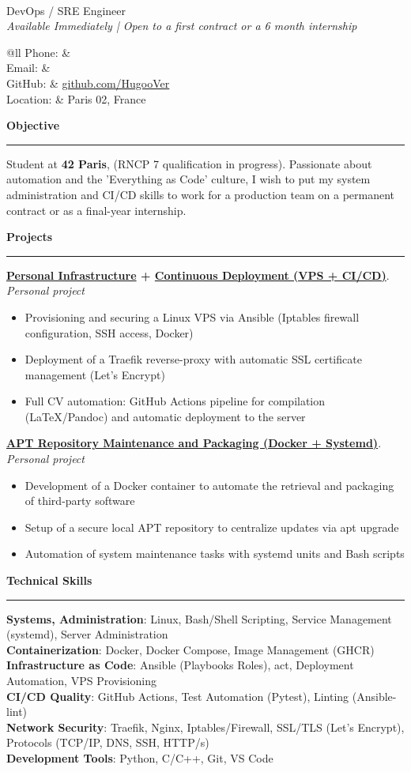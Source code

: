 \documentclass[10pt,a4paper]{article}
\makeatletter
\newcommand{\nom}{\detokenize{${NAME}}}
\newcommand{\poste}{DevOps / SRE Engineer}
\newcommand{\mail}{\detokenize{${MAIL}}}
\newcommand{\phone}{\detokenize{${PHONE}}}
\newcommand{\makecvheader}{
      \begin{minipage}[t]{0.6\textwidth}
        {\huge \textbf{\nom}}\\[0.2em]
        {\large \poste}\\[0.5em]
        \textit{Available Immediately | Open to a first contract or a 6 month internship}
      \end{minipage}
      \hfill
      \begin{minipage}[t]{0.35\textwidth}
        \begin{tabular}{@{}ll}
          Phone: & \phone \\
          Email: & \href{mailto:\mail}{\mail{}} \\
          GitHub: & \href{https://github.com/HugooVer}{github.com/HugooVer} \\
          Location: & Paris 02, France \\
        \end{tabular}
      \end{minipage}
      \vspace{0.4em}
    }
\newcommand{\cvsection}[1]{
      \vspace{0.8em}
      {\large\bfseries\textcolor{sectioncolor}{#1}}\\[-0.5em]
      \rule{\linewidth}{0.4pt}\vspace{0.4em}
    }
\makeatother
\begin{document}
\makecvheader


\cvsection{Objective}
Student at \textbf{42 Paris}, (RNCP 7 qualification in progress). Passionate about automation and the 'Everything as Code' culture, I wish to put my system administration and CI/CD skills to work for a production team on a permanent contract or as a final-year internship.

\cvsection{Projects}
\textbf{\href{https://github.com/HugooVer/my-vps}{Personal Infrastructure} + \href{https://github.com/HugooVer/Resume-CI-CD}{Continuous Deployment (VPS + CI/CD)}}.\\
\textit{Personal project}
\begin{itemize}
  \item Provisioning and securing a Linux VPS via Ansible (Iptables firewall configuration, SSH access, Docker)
  \item Deployment of a Traefik reverse-proxy with automatic SSL certificate management (Let's Encrypt)
  \item Full CV automation: GitHub Actions pipeline for compilation (LaTeX/Pandoc) and automatic deployment to the server
\end{itemize}

\textbf{\href{https://github.com/HugooVer/discord-repo-updater}{APT Repository Maintenance and Packaging (Docker + Systemd)}}.\\
\textit{Personal project}
\begin{itemize}
  \item Development of a Docker container to automate the retrieval and packaging of third-party software
  \item Setup of a secure local APT repository to centralize updates via apt upgrade
  \item Automation of system maintenance tasks with systemd units and Bash scripts
\end{itemize}

\cvsection{Technical Skills}
\textbf{Systems, Administration}: Linux, Bash/Shell Scripting, Service Management (systemd), Server Administration\\
\textbf{Containerization}: Docker, Docker Compose, Image Management (GHCR)\\
\textbf{Infrastructure as Code}: Ansible (Playbooks Roles), act, Deployment Automation, VPS Provisioning\\
\textbf{CI/CD Quality}: GitHub Actions, Test Automation (Pytest), Linting (Ansible-lint)\\
\textbf{Network Security}: Traefik, Nginx, Iptables/Firewall, SSL/TLS (Let's Encrypt), Protocols (TCP/IP, DNS, SSH, HTTP/s)\\
\textbf{Development Tools}: Python, C/C++, Git, VS Code
\end{document}
